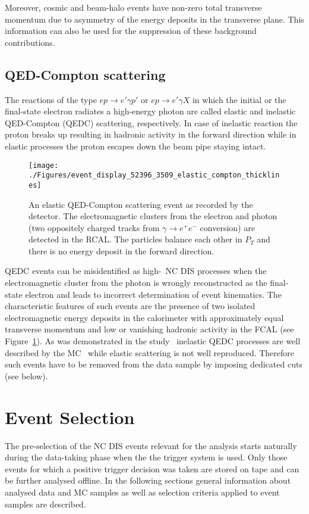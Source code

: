 Moreover, cosmic and beam-halo events have non-zero total transverse momentum due to asymmetry of the energy deposits in the transverse plane. This information can also be used for the suppression of these background contributions.

\subsection{QED-Compton scattering}
The reactions of the type $ep \rightarrow e' \gamma p'$ or $ep \rightarrow e'\gamma X$ in which the initial or the final-state electron radiates a high-energy photon are called elastic and inelastic QED-Compton (QEDC) scattering, respectively. In case of inelastic reaction the proton breaks up resulting in hadronic activity in the forward direction while in elastic processes the proton escapes down the beam pipe staying intact. 
\begin{figure}[htbp]
	\centering
	\texttt{[image: ./Figures/event\_display\_52396\_3509\_elastic\_compton\_thicklines]} 
	\caption{An elastic QED-Compton scattering event as recorded by the \zeus detector. The electromagnetic clusters from the electron and photon (two oppositely charged tracks from $\gamma \rightarrow e^+e^-$ conversion) are detected in the RCAL. The particles balance each other in $P_T$ and there is no energy deposit in the forward direction.}
	\label{fig:qedceventdisplay}
\end{figure}

QEDC events can be misidentified as high-\qsq~NC DIS processes when the electromagnetic cluster from the photon is wrongly reconstructed as the final-state electron and leads to incorrect determination of event kinematics. The characteristic features of such events are the presence of two isolated electromagnetic energy deposits in the calorimeter with approximately equal transverse momentum and low or vanishing hadronic activity in the FCAL (see Figure~\ref{fig:qedceventdisplay}). As was demonstrated in the study~\cite{thesis:moritz:2001} inelastic QEDC processes are well described by the \djangoh MC~\cite{cpc:81:381} while elastic scattering is not well reproduced. Therefore such events have to be removed from the data sample by imposing dedicated cuts (see below).

\section{Event Selection}
The pre-selection of the NC DIS events relevant for the analysis starts naturally during the data-taking phase when the the \zeus trigger system is used. Only those events for which a positive trigger decision was taken are stored on tape and can be further analysed offline. In the following sections general information about analysed data and MC samples as well as selection criteria applied to event samples are described.

